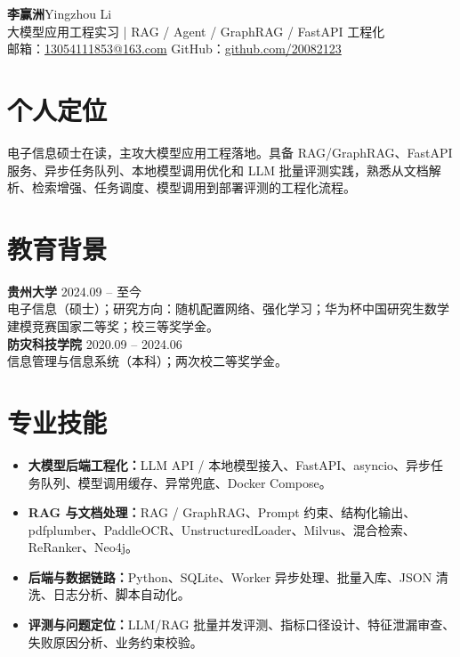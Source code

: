 \documentclass[10pt,a4paper]{article}
\begin{document}
{\Huge\bfseries 李赢洲}\hfill {\large Yingzhou Li}\\[0.35em]
{\color{cobalt}\large 大模型应用工程实习 | RAG / Agent / GraphRAG / FastAPI 工程化}\\[0.4em]
邮箱：\href{mailto:13054111853@163.com}{13054111853@163.com}
\quad GitHub：\href{https://github.com/20082123}{github.com/20082123}

\section*{个人定位}
电子信息硕士在读，主攻大模型应用工程落地。具备 RAG/GraphRAG、FastAPI 服务、异步任务队列、本地模型调用优化和 LLM 批量评测实践，熟悉从文档解析、检索增强、任务调度、模型调用到部署评测的工程化流程。

\section*{教育背景}
\textbf{贵州大学} \hfill 2024.09 -- 至今\\
电子信息（硕士）；研究方向：随机配置网络、强化学习；华为杯中国研究生数学建模竞赛国家二等奖；校三等奖学金。\\[0.25em]
\textbf{防灾科技学院} \hfill 2020.09 -- 2024.06\\
信息管理与信息系统（本科）；两次校二等奖学金。

\section*{专业技能}
\begin{itemize}
  \item \textbf{大模型后端工程化：}LLM API / 本地模型接入、FastAPI、asyncio、异步任务队列、模型调用缓存、异常兜底、Docker Compose。
  \item \textbf{RAG 与文档处理：}RAG / GraphRAG、Prompt 约束、结构化输出、pdfplumber、PaddleOCR、UnstructuredLoader、Milvus、混合检索、ReRanker、Neo4j。
  \item \textbf{后端与数据链路：}Python、SQLite、Worker 异步处理、批量入库、JSON 清洗、日志分析、脚本自动化。
  \item \textbf{评测与问题定位：}LLM/RAG 批量并发评测、指标口径设计、特征泄漏审查、失败原因分析、业务约束校验。
\end{itemize}
\end{document}
